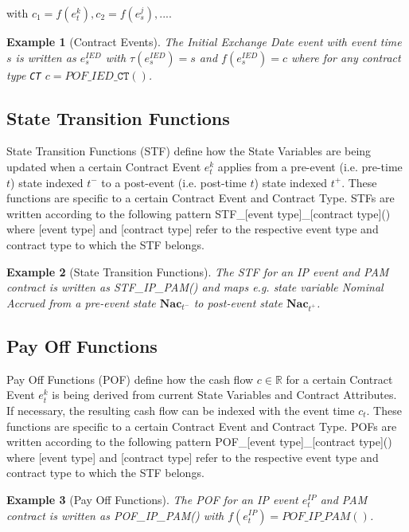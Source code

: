 \documentclass[9pt,oneside]{amsart}
\newtheorem{example}{Example}
\newcommand{\Real}{\mathbb{R}}
\newcommand{\svar}[2]{\textbf{#1}_{#2}}
\newcommand{\attr}[1]{\texttt{#1}}
\newcommand{\stf}[2]{STF\_#1\_#2()}
\newcommand{\pof}[2]{POF\_#1\_#2()}
\newcommand{\tev}[1]{\tau(#1)}
\newcommand{\fev}[1]{f(#1)}
\begin{document}
\begin{multicols}{2}
with $c_1=\fev{e_t^k}, c_2=\fev{e_s^j}, ...$.

\begin{example}[Contract Events]
The \textit{Initial Exchange Date} event with event time $s$ is written as $e_s^{IED}$ with $\tev{e_s^{IED}}=s$ and $\fev{e_s^{IED}}=c$ where for any contract type \attr{CT} $c=\pof{IED}{\attr{CT}}$.
\end{example}


\subsection{State Transition Functions}

State Transition Functions (STF) define how the State Variables are being updated when a certain Contract Event $e_t^{k}$ applies from a pre-event (i.e. pre-time $t$) state indexed $t^-$ to a post-event (i.e. post-time $t$) state indexed $t^+$. These functions are specific to a certain Contract Event and Contract Type. STFs are written according to the following pattern \stf{[event type]}{[contract type]} where [event type] and [contract type] refer to the respective event type and contract type to which the STF belongs.

\begin{example}[State Transition Functions]
The STF for an IP event and PAM contract is written as \stf{IP}{PAM} and maps e.g. state variable \textit{Nominal Accrued} from a pre-event state $\svar{Nac}{t^-}$ to post-event state $\svar{Nac}{t^+}$.
\end{example}


\subsection{Pay Off Functions}

Pay Off Functions (POF) define how the cash flow $c\in\Real$ for a certain Contract Event $e_t^k$ is being derived from current State Variables and Contract Attributes. If necessary, the resulting cash flow can be indexed with the event time $c_t$. These functions are specific to a certain Contract Event and Contract Type. POFs are written according to the following pattern \pof{[event type]}{[contract type]} where [event type] and [contract type] refer to the respective event type and contract type to which the STF belongs.

\begin{example}[Pay Off Functions]
The POF for an IP event $e_t^{IP}$ and PAM contract is written as \pof{IP}{PAM} with $\fev{e_t^{IP}}=\pof{IP}{PAM}$.
\end{example}



\end{multicols}
\end{document}

